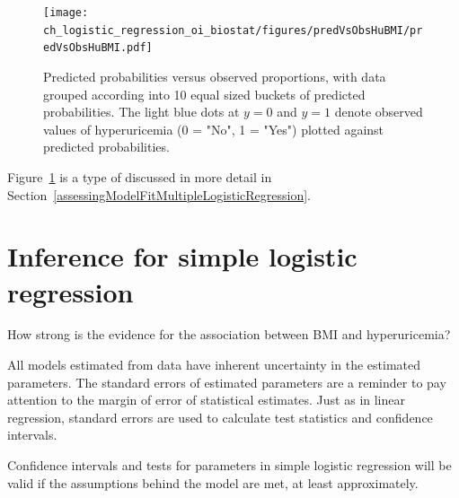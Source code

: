 \begin{figure}[!tbh]
  \centering
  \texttt{[image: ch\_logistic\_regression\_oi\_biostat/figures/predVsObsHuBMI/predVsObsHuBMI.pdf]}
    \caption{Predicted probabilities versus observed proportions, with data grouped according into 10 equal sized buckets of predicted probabilities. The light blue dots at  $y = 0$ and $y = 1$ denote observed values of hyperuricemia (0 = "No", 1 = "Yes") plotted against predicted probabilities.}
    \label{figure:predVsObsHuBMI}
\end{figure}

Figure~\ref{figure:predVsObsHuBMI} is a type of   discussed in more detail in Section~\ref{assessingModelFitMultipleLogisticRegression}.




\section{Inference for simple logistic regression} \label{inferenceSimpleLogisticRegression}

How strong is the evidence for the association between BMI and hyperuricemia?

All models estimated from data have inherent uncertainty in the estimated parameters.  The standard errors of estimated parameters are a reminder to pay attention to the margin of error of statistical estimates.  Just as in linear regression, standard errors are used to calculate test statistics and confidence intervals.

Confidence intervals and tests for parameters in simple logistic regression will be valid if the assumptions behind the model are met, at least approximately.


